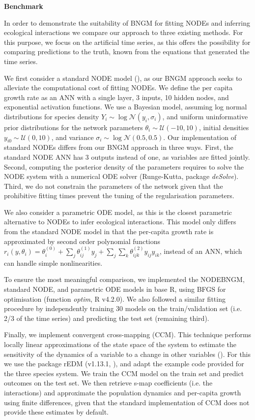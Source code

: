 \documentclass[11pt, oneside]{article}
\begin{document}
\textbf{Benchmark}

In order to demonstrate the suitability of BNGM for fitting NODEs and inferring ecological interactions we compare our approach to three existing methods.
For this purpose, we focus on the artificial time series, as this offers the possibility for comparing predictions to the truth, known from the equations that generated the time series.

We first consider a standard NODE model (\cite{Bonnaffe2021a}), as our BNGM approach seeks to alleviate the computational cost of fitting NODEs.
We define the per capita growth rate as an ANN with a single layer, 3 inputs, 10 hidden nodes, and exponential activation functions.
We use a Bayesian model, assuming log normal distributions for species density $Y_i \sim \log\mathcal{N}(y_i,\sigma_i)$, and uniform uninformative prior distributions for the network parameters $\theta_i \sim \mathcal{U}(-10,10)$, initial densities $y_{i0} \sim \mathcal{U}(0,10)$, and variance $\sigma_i \sim \log\mathcal{N}(0.5,0.5)$.
Our implementation of standard NODEs differs from our BNGM approach in three ways.
First, the standard NODE ANN has 3 outputs instead of one, as variables are fitted jointly.
Second, computing the posterior density of the parameters requires to solve the NODE system with a numerical ODE solver (Runge-Kutta, package \textit{deSolve}).
Third, we do not constrain the parameters of the network given that the prohibitive fitting times prevent the tuning of the regularisation parameters.

We also consider a parametric ODE model, as this is the closest parametric alternative to NODEs to infer ecological interactions.
This model only differs from the standard NODE model in that the per-capita growth rate is approximated by second order polynomial functions $r_i(y,\theta_i) = \theta_i^{(0)} + \sum_j \theta_{ij}^{(1)} y_j + \sum_j \sum_k \theta_{ijk}^{(2)} y_{ij} y_{ik}$, instead of an ANN, which can handle simple nonlinearities.

To ensure the most meaningful comparison, we implemented the NODEBNGM, standard NODE, and parametric ODE models in base R, using BFGS for optimisation (function \textit{optim}, R v4.2.0).
We also followed a similar fitting procedure by independently training 30 models on the train/validation set (i.e. 2/3 of the time series) and predicting the test set (remaining third).

Finally, we implement convergent cross-mapping (CCM).
This technique performs locally linear approximations of the state space of the system to estimate the sensitivity of the dynamics of a variable to a change in other variables (\cite{Sugihara2012}).
For this we use the package rEDM (v1.13.1, \cite{Sugihara2012}), and adapt the example code provided for the three species system.
We train the CCM model on the train set and predict outcomes on the test set.
We then retrieve s-map coefficients (i.e. the interactions) and approximate the population dynamics and per-capita growth using finite differences, given that the standard implementation of CCM does not provide these estimates by default.
\end{document}
